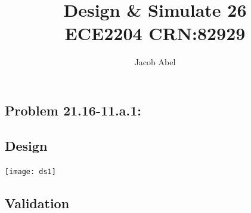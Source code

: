 \documentclass[12pt,letterpaper,titlepage]{article}
\author{Jacob Abel}
\title{	Design \& Simulate 26
	\\\large ECE2204 CRN:82929
}
\begin{document}
\maketitle
\begin{raggedright}
\section{Problem 21.16-11.a.1: } 
\subsection{Design}



\begin{center}
\texttt{[image: ds1]}
\end{center}

\clearpage
\subsection{Validation}


\end{raggedright}
\end{document}
